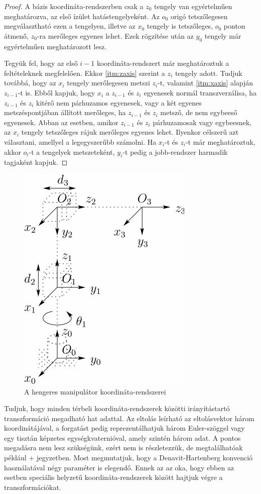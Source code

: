 \documentclass[12pt,a4paper]{report}
\theoremstyle{remark}
\theoremstyle{definition}
\begin{document}
\begin{proof}
A bázis koordináta-rendszerben csak a $z_0$ tengely van egyértelműen meghatározva, az első ízület 
hatástengelyeként. Az $o_0$ origó tetszőlegesen megválasztható ezen a tengelyen, illetve az $x_0$ tengely is 
tetszőleges, $o_0$ ponton átmenő, $z_0$-ra merőleges egyenes lehet. Ezek rögzítése után az $y_0$ tengely már 
egyértelműen meghatározott lesz.

Tegyük fel, hogy az első $i-1$ koordináta-rendszert már meghatároztuk a feltételeknek megfelelően. Ekkor 
\ref{itm:zaxis} szerint a $z_i$ tengely adott. Tudjuk továbbá, hogy az $x_i$ tengely merőlegesen metszi $z_i$-t, 
valamint \ref{itm:xaxis} alapján $z_{i-1}$-t is. Ebből kapjuk, hogy $x_i$ a $z_{i-1}$ és $z_i$ egyenesek normál 
transzverzálisa, ha $z_{i-1}$ és $z_i$ kitérő nem párhuzamos egyenesek, vagy a két egyenes metszéspontjában állított 
merőleges, ha $z_{i-1}$ és $z_i$ metsző, de nem egybeeső egyenesek. Abban az esetben, amikor $z_{i-1}$ és $z_i$ 
párhuzamosak vagy egybeesnek, az $x_i$ tengely tetszőleges rájuk merőleges egyenes lehet. Ilyenkor célszerű azt 
választani, amellyel a legegyszerűbb számolni. Ha $x_i$-t és $z_i$-t már meghatároztuk, akkor $o_i$-t a tengelyek 
metszeteként, $y_i$-t pedig a jobb-rendszer harmadik tagjaként kapjuk.
\end{proof}

\begin{figure}[h]
\centering
\includegraphics[width=0.35\linewidth]{./images/Cylindrical_frames}
\caption{A hengeres manipulátor koordináta-rendszerei}
\end{figure}

Tudjuk, hogy minden térbeli koordináta-rendszerek közötti irányítástartó transzformáció megadható hat adattal. Az 
eltolás leírható az eltolásvektor három koordinátájával, a forgatást pedig reprezentálhatjuk három Euler-szöggel 
vagy egy tisztán képzetes egységkvaternióval, amely szintén három adat. A pontos megadásra nem lesz szükségünk, 
ezért nem is részletezzük, de megtalálhatóak például \az+\autocite{spong_robot} jegyzetben.  Most megmutatjuk, hogy 
a Denavit-Hartenberg konvenció használatával négy paraméter is elegendő. Ennek az az oka, hogy ebben az esetben 
speciális helyzetű koordináta-rendszerek között hajtjuk végre a transzformációkat.
\end{document}

